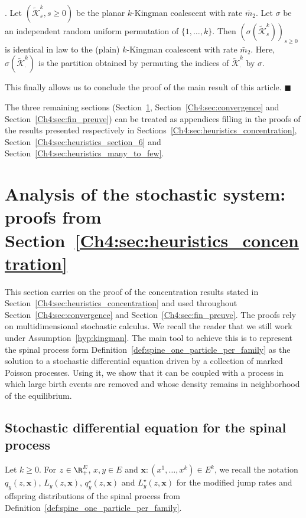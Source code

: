 \begin{refsegment}
\begin{lem}{\cite{Foutel-Rodier:UMS}.}
    Let $(\tilde{\mathcal{K}}^{k}_s, s\geq 0)$ be the planar $k$-Kingman
    coalescent with rate $\bar m_2$. Let $\sigma$ be an independent random
    uniform permutation of $\{1,\ldots, k\}$. Then $(\sigma(\tilde{\mathcal{K}}^{k}_s))_{s \geq 0}$
    is identical in law to the (plain) $k$-Kingman coalescent with
    rate $\bar m_2$. Here, $\sigma(\tilde{\mathcal{K}}^{k}_{\cdot})$ is the partition
    obtained by permuting the indices of $\tilde{\mathcal{K}}^{k}_{\cdot}$ by $\sigma$.
\end{lem}
This finally allows us to conclude the proof of the main result of this article.
\hfill$\blacksquare$

\medskip

The three remaining sections (Section~\ref{Ch4:sec:calcul_sto}, Section~\ref{Ch4:sec:convergence} and Section~\ref{Ch4:sec:fin_preuve}) can be treated as appendices filling in the proofs of the results presented respectively in Sections~\ref{Ch4:sec:heuristics_concentration}, Section~\ref{Ch4:sec:heuristics_section_6} and Section~\ref{Ch4:sec:heuristics_many_to_few}.


\section{Analysis of the stochastic system: proofs from Section~\ref{Ch4:sec:heuristics_concentration}}\label{Ch4:sec:calcul_sto}
This section carries on the proof of the concentration results stated in Section~\ref{Ch4:sec:heuristics_concentration} and used throughout Section~\ref{Ch4:sec:convergence} and Section~\ref{Ch4:sec:fin_preuve}. The proofs rely on multidimensional stochastic calculus.
We recall the reader that we still work under Assumption~\ref{hyp:kingman}. The main tool to achieve this is to represent the spinal process form Definition~\ref{def:spine_one_particle_per_family} as the solution to a stochastic differential equation driven by a collection of marked Poisson processes. Using it, we show that it can be coupled with a process in which large birth events are removed and whose density remains in neighborhood of the equilibrium. 

 \subsection{Stochastic differential equation for the spinal process}
Let $k\geq 0$. For $ z\in \R_+^E$, $x,y\in E$ and $ \bm x : (x^1,\ldots, x^k)\in E^k$,
we recall the notation $q_y(z,\bm x)$, $L_y(z,\bm x)$, $q^\star_y(z,\bm x)$ and $L^\star_y(z,\bm x)$ for the modified jump rates and offspring distributions of the spinal process from Definition~\ref{def:spine_one_particle_per_family}. 


\end{refsegment}
